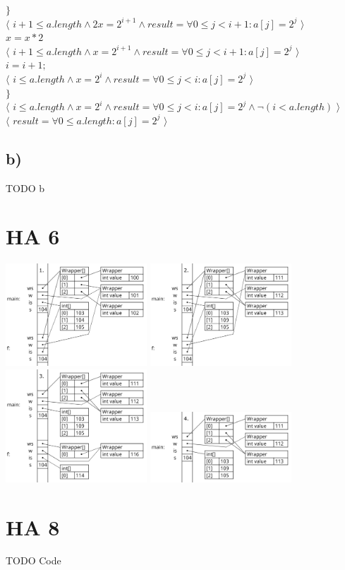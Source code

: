 \documentclass[a4paper]{article}
\begin{document}
$\}$\\
$\langle$ $i + 1 \leq a.length \land 2x=2^{i + 1} \land result = \forall 0 \leq j < i + 1: a[j] = 2^j$ $\rangle$\\
$x = x * 2$\\
$\langle$ $i + 1 \leq a.length \land x=2^{i + 1} \land result = \forall 0 \leq j < i + 1: a[j] = 2^j$ $\rangle$\\
$i = i + 1;$ \\
$\langle$ $i \leq a.length \land x=2^{i} \land result = \forall 0 \leq j < i: a[j] = 2^j$ $\rangle$\\
$\}$\\
$\langle$ $i \leq a.length \land x=2^{i} \land result = \forall 0 \leq j < i: a[j] = 2^j \land \neg (i < a.length)$ $\rangle$\\
$\langle$ $result = \forall 0 \leq a.length : a[j] = 2^j $ $\rangle$\\

\subsection*{b)}



TODO b

\section*{ HA 6 }

	\includegraphics*[width=200px]{ProgramData_1.png} 
	\includegraphics*[width=200px]{ProgramData_2.png} 
	\includegraphics*[width=200px]{ProgramData_3.png} 
	\includegraphics*[width=200px]{ProgramData_4.png} 

\section*{ HA 8 }

TODO Code
\end{document}
